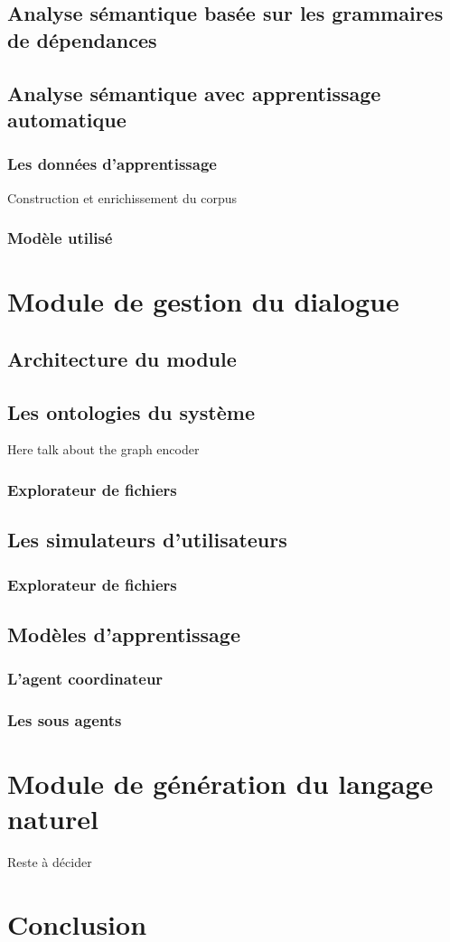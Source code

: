 	\subsection{Analyse sémantique basée sur les grammaires de dépendances}
	\subsection{Analyse sémantique avec apprentissage automatique}
		\subsubsection{Les données d'apprentissage}
		Construction et enrichissement du corpus 
		\subsubsection{Modèle utilisé}
	
	
\section{Module de gestion du dialogue}
	\subsection{Architecture du module}
	\subsection{Les ontologies du système}
		Here talk about the graph encoder 
		\subsubsection*{Explorateur de fichiers}
	\subsection{Les simulateurs d'utilisateurs}
		\subsubsection*{Explorateur de fichiers}
	\subsection{Modèles d'apprentissage}
		\subsubsection*{L'agent coordinateur}
		\subsubsection*{Les sous agents}

\section{Module de génération du langage naturel}
	Reste à décider
\section{Conclusion}	